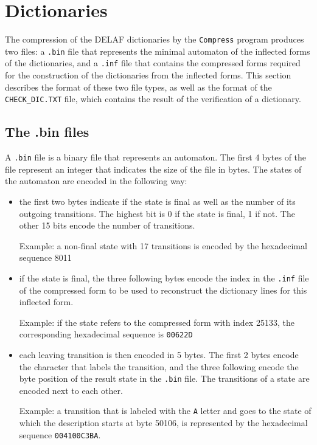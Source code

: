 \section{Dictionaries}
The compression of the DELAF dictionaries by the \verb+Compress+ program produces
two files: a \verb+.bin+ file that represents the minimal automaton of the
inflected forms of the dictionaries, and a \verb+.inf+ file that contains the
compressed forms required for the construction of the dictionaries from the
inflected forms. This section describes the format of these two file types, as
well as the format of the \verb+CHECK_DIC.TXT+ file, which contains the result of
the verification of a dictionary.


\subsection{The .bin files}
A \verb$.bin$ file is a binary file that represents an automaton. The first 4
bytes of the file represent an integer that indicates the size of the file in
bytes. The states of the automaton are encoded in the following way:
\begin{itemize}

  \item the first two bytes indicate if the state is final as well as the number
  of its outgoing transitions. The highest bit is 0 if the state is final, 1 if
  not. The other 15 bits encode the number of transitions.

  \bigskip Example: a non-final state with 17 transitions is encoded by the
  hexadecimal sequence 8011
  

  \bigskip \item if the state is final, the three following bytes encode the
  index in the \verb+.inf+ file of the compressed form to be used to reconstruct
  the dictionary lines for this inflected form.

  
  \bigskip Example: if the state refers to the compressed form with index 25133,
  the corresponding hexadecimal sequence is \verb+00622D+
  

  \bigskip \item each leaving transition is then encoded in 5 bytes. The first 2
  bytes encode the character that labels the transition, and the three following
  encode the byte position of the result state in the \verb+.bin+ file. The
  transitions of a state are encoded next to each other.

  \bigskip Example: a transition that is labeled with the \verb+A+ letter and
  goes to the state of which the description starts at byte 50106, is represented
  by the hexadecimal sequence \verb+004100C3BA+.

\end{itemize}

